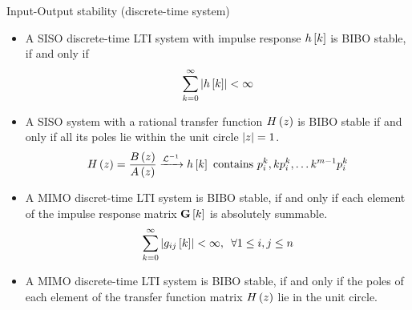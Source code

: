 \documentclass[aspectratio=169]{beamer}
\def\mf{\ensuremath\mathbf}
\def\lp{\ensuremath\left(}
\def\rp{\ensuremath\right)}
\def\lv{\ensuremath\left\lvert}
\def\rv{\ensuremath\right\rvert}
\def\ls{\ensuremath\left[}
\def\rs{\ensuremath\right]}
\newcommand{\ct}[1]{\lp #1\rp}
\newcommand{\dt}[1]{\ls #1\rs}
\begin{document}
\begin{frame}{Input-Output stability (discrete-time system)}
\begin{itemize}
    \item A SISO discrete-time LTI system with impulse response $h\dt{k}$ is BIBO stable, if and only if
    \[ \sum_{k=0}^{\infty} \lv h\dt{k}\rv < \infty \]

    \item A SISO system with a rational transfer function $H\ct{z}$ is BIBO stable if and only if all its poles lie within the unit circle $\lv z\rv = 1$.
    \[ H\ct{z} = \frac{B\ct{z}}{A\ct{z}} \xrightarrow{\mathcal{L}^{-1}} h\dt{k} \text{ contains } p_i^k, kp_i^k, \ldots k^{m-1}p_i^k \]

    \item A MIMO discret-time LTI system is BIBO stable, if and only if each element of the impulse response matrix $\mf{G}\dt{k}$ is absolutely summable.
    \[ \sum_{k=0}^\infty \lv g_{ij}\dt{k}\rv < \infty , \,\,\, \forall 1 \leq i, j \leq n \]

    \item A MIMO discrete-time LTI system is BIBO stable, if and only if the poles of each element of the transfer function matrix $H\ct{z}$ lie in the unit circle.
\end{itemize}
\end{frame} 
\end{document}
